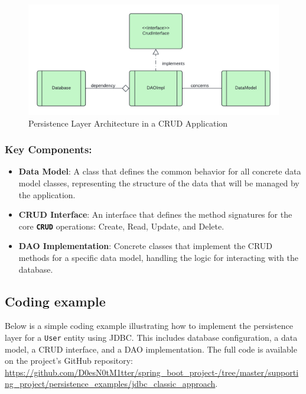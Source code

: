 \documentclass{article}
\begin{document}
\begin{figure}[H]
    \centering
    \begin{framed}
        \includegraphics[width=0.8\linewidth]{images/jdbc_business_logic.png}
    \end{framed}
    \caption{Persistence Layer Architecture in a CRUD Application}
    \label{fig:spring-logo}
\end{figure}

\subsubsection*{Key Components:}

\begin{itemize}
    \item \textbf{Data Model}: A class that defines the common behavior for all concrete data model classes, representing the structure of the data that will be managed by the application.

    \item \textbf{CRUD Interface}: An interface that defines the method signatures for the core \textbf{\texttt{CRUD}} operations: Create, Read, Update, and Delete.

    \item \textbf{DAO Implementation}: Concrete classes that implement the CRUD methods for a specific data model, handling the logic for interacting with the database.
\end{itemize}

\subsection{Coding example }

Below is a simple coding example illustrating how to implement the persistence layer for a \texttt{User} entity using JDBC. This includes database configuration, a data model, a CRUD interface, and a DAO implementation. The full code is available on the project's GitHub repository:\\ \url{https://github.com/D0esN0tM1tter/spring_boot_project-/tree/master/supporting_project/persistence_examples/jdbc_classic_approach}.
\end{document}
